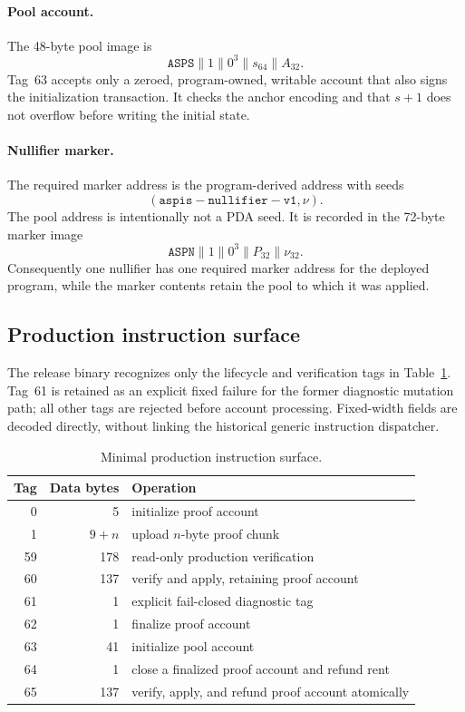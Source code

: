 \paragraph{Pool account.}
The 48-byte pool image is
\[
  \mathtt{ASPS}\mathbin\|1\mathbin\|0^3
  \mathbin\|s_{64}\mathbin\|A_{32}.
\]
Tag~63 accepts only a zeroed, program-owned, writable account that also signs
the initialization transaction.  It checks the anchor encoding and that
\(s+1\) does not overflow before writing the initial state.

\paragraph{Nullifier marker.}
The required marker address is the program-derived address with seeds
\[
  (\mathtt{aspis-nullifier-v1},\nu).
\]
The pool address is intentionally not a PDA seed.  It is recorded in the
72-byte marker image
\[
  \mathtt{ASPN}\mathbin\|1\mathbin\|0^3
  \mathbin\|P_{32}\mathbin\|\nu_{32}.
\]
Consequently one nullifier has one required marker address for the deployed
program, while the marker contents retain the pool to which it was applied.

\subsection{Production instruction surface}
\label{sec:implementation-dispatch}

The release binary recognizes only the lifecycle and verification tags in
Table~\ref{tab:production-tags}.  Tag~61 is retained as an explicit fixed
failure for the former diagnostic mutation path; all other tags are rejected
before account processing.  Fixed-width fields are decoded directly, without
linking the historical generic instruction dispatcher.

\begin{table}[t]
  \centering
  \small
  \caption{Minimal \Profile{} production instruction surface.}
  \label{tab:production-tags}
  \begin{tabular}{r r l}
    \toprule
    Tag & Data bytes & Operation \\
    \midrule
    0  & 5       & initialize proof account \\
    1  & \(9+n\) & upload \(n\)-byte proof chunk \\
    59 & 178     & read-only production verification \\
    60 & 137     & verify and apply, retaining proof account \\
    61 & 1       & explicit fail-closed diagnostic tag \\
    62 & 1       & finalize proof account \\
    63 & 41      & initialize pool account \\
    64 & 1       & close a finalized proof account and refund rent \\
    65 & 137     & verify, apply, and refund proof account atomically \\
    \bottomrule
  \end{tabular}
\end{table}

